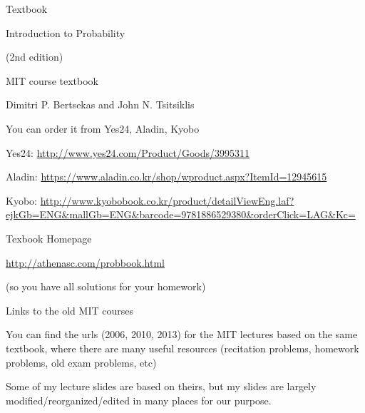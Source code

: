 \begin{frame}{Textbook}

\plitemsep 0.02in

{
\bci
\item Introduction to Probability

(2nd edition)

\bci
\item MIT course textbook
\item Dimitri P. Bertsekas and John N. Tsitsiklis
\eci

\item You can order it from Yes24, Aladin, Kyobo
\bci
\item \scriptsize Yes24: \url{http://www.yes24.com/Product/Goods/3995311}
\item \scriptsize Aladin: \url{https://www.aladin.co.kr/shop/wproduct.aspx?ItemId=12945615}
\item \scriptsize Kyobo: \url{http://www.kyobobook.co.kr/product/detailViewEng.laf?ejkGb=ENG&mallGb=ENG&barcode=9781886529380&orderClick=LAG&Kc=}
\eci
  \eci
}
{
\centering
{}
}


\end{frame}


\begin{frame}{Texbook Homepage}

  \plitemsep 0.1in
  \bci

  \item<1-> \url{http://athenasc.com/probbook.html}

  \item<2->  (so you have all solutions for
    your homework) 

  \item<2-> Links to the old MIT courses

    \item<3-> You can find the urls (2006, 2010, 2013) for the MIT lectures
  based on the same textbook, where there are many useful resources
  (recitation problems, homework problems, old exam problems, etc)

\medskip
\item<4-> Some of my lecture slides are based on theirs, but my slides
   are largely  modified/reorganized/edited in many places for our
   purpose.

    \eci



\end{frame}

